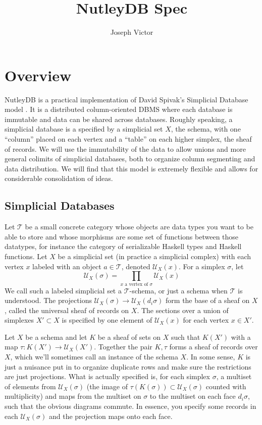 \documentclass[a4paper,12pt]{article}
\theoremstyle{mydef}
\theoremstyle{myremark}
\begin{document}
\title{NutleyDB Spec}
\author{Joseph Victor}
\maketitle
\tableofcontents
\mainmatter

\section{Overview}

NutleyDB is a practical implementation of David Spivak's Simplicial Database model \cite{sd}.
It is a distributed column-oriented DBMS where each database is immutable and data can be shared across databases.
Roughly speaking, a simplicial database is a specified by a simplicial set $X$, the schema, with one ``column'' placed on each vertex and a ``table'' on each higher simplex, the sheaf of records.
We will use the immutability of the data to allow unions and more general colimits of simplicial databases, both to organize column segmenting and data distribution.
We will find that this model is extremely flexible and allows for considerable consolidation of ideas.

\subsection{Simplicial Databases}

Let $\mathcal{T}$ be a small concrete category whose objects are data types you want to be able to store and whose morphisms are some set of functions between those datatypes, for instance the category of serializable Haskell types and Haskell functions.  
Let $X$ be a simplicial set (in practice a simplicial complex) with each vertex $x$ labeled with an object $a\in\mathcal{T}$, denoted $\mathcal{U}_X(x)$.
For a simplex $\sigma$, let 
\[\mathcal{U}_X(\sigma)=\prod_{x\mbox{ a vertex of $\sigma$}}\mathcal{U}_X(x)\]
We call such a labeled simplicial set a $\mathcal{T}$-schema, or just a schema when $\mathcal{T}$ is understood.
The projections $\mathcal{U}_X(\sigma)\to\mathcal{U}_X(d_i\sigma)$ form the base of a sheaf on $X$, called the universal sheaf of records on $X$.
The sections over a union of simplexes $X'\subset X$ is specified by one element of $\mathcal{U}_X(x)$ for each vertex $x\in X'$.


Let $X$ be a schema and let $K$ be a sheaf of sets on $X$ such that $K(X')$ with a map $\tau:K(X')\to \mathcal{U}_X(X')$.
Together the pair $K,\tau$ forms a sheaf of records over $X$, which we'll sometimes call an instance of the schema $X$.  
In some sense, $K$ is just a nuisance put in to organize duplicate rows and make sure the restrictions are just projections. 
What is actually specified is, for each simplex $\sigma$, a multiset of elements from $\mathcal{U}_X(\sigma)$ (the image of $\tau(K(\sigma))\subset \mathcal{U}_X(\sigma)$ counted with multiplicity) and maps from the multiset on $\sigma$ to the multiset on each face $d_i\sigma$, such that the obvious diagrams commute.  
In essence, you specify some records in each $\mathcal{U}_X(\sigma)$ and the projection maps onto each face.
\end{document}
